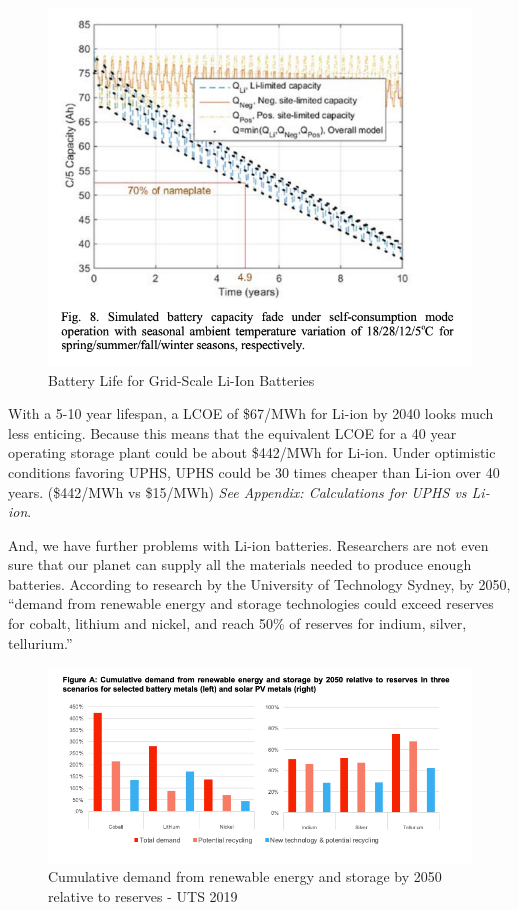 \documentclass[hidelinks,12pt,a4paper]{article}
\begin{document}
\begin{figure}[ht!]
    \centering
    \includegraphics[width=.85\textwidth]{li-ion-battery-life.png}
    \caption{Battery Life for Grid-Scale Li-Ion Batteries \cite{LifePredictionModelForLiIonBattery}}
\end{figure}
\FloatBarrier

With a 5-10 year lifespan, a LCOE of \$67/MWh for Li-ion by 2040 looks much less enticing. Because this means that the equivalent LCOE for a 40 year operating storage plant could be about \$442/MWh for Li-ion. Under optimistic conditions favoring UPHS, UPHS could be 30 times cheaper than Li-ion over 40 years. (\$442/MWh vs \$15/MWh) \textit{See Appendix: Calculations for UPHS vs Li-ion}.

And, we have further problems with Li-ion batteries. Researchers are not even sure that our planet can supply all the materials needed to produce enough batteries. According to research by the University of Technology Sydney, by 2050, “demand from renewable energy and storage technologies could exceed reserves for cobalt, lithium and nickel, and reach 50\% of reserves for indium, silver, tellurium.”

\begin{figure}[ht!]
    \centering
    \includegraphics[width=1\textwidth]{chemical-battery-reserves-for-2050.png}
    \caption{Cumulative demand from renewable energy and storage by 2050 relative to reserves -  UTS 2019 \cite{ResponsibleMineralsSourcingForRenewableEnergy}}
\end{figure}
\FloatBarrier
\end{document}
